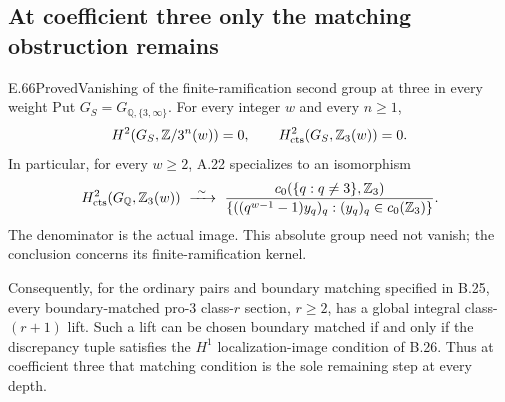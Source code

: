 \subsection{At coefficient three only the matching obstruction remains}

\begin{result}{E.66}{Proved}{Vanishing of the finite-ramification second group at three in every weight}
\label{coh:threeallweights}
Put $G_S=G_{\mathbb Q,\{3,\infty\}}$. For every integer $w$ and
every $n\geq1$,
\[
 H^2(G_S,\mathbb Z/3^n(w))=0,
 \qquad
 H^2_{\rm cts}(G_S,\mathbb Z_3(w))=0.
\]
In particular, for every $w\geq2$, A.22 specializes to an
isomorphism
\[
 H^2_{\rm cts}(G_{\mathbb Q},\mathbb Z_3(w))
 \ \xrightarrow{\ \sim\ }\
 \frac{c_0(\{q:q\ne3\},\mathbb Z_3)}
      {\{((q^{w-1}-1)y_q)_q:(y_q)_q\in c_0(\mathbb Z_3)\}}.
\]
The denominator is the actual image. This absolute group need
not vanish; the conclusion concerns its finite-ramification
kernel.

Consequently, for the ordinary pairs and boundary matching
specified in B.25, every boundary-matched pro-$3$ class-$r$
section, $r\geq2$, has a global integral class-$(r+1)$ lift.
Such a lift can be chosen boundary matched if and only if the
discrepancy tuple satisfies the $H^1$ localization-image condition
of B.26. Thus at coefficient three that matching condition is
the sole remaining step at every depth.
\end{result}

